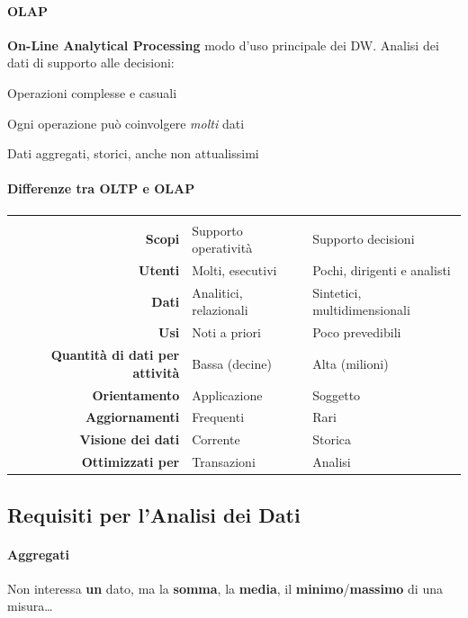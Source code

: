 \documentclass[10pt]{book}
\begin{document}
\begin{multicols}{2}
\paragraph{OLAP} \textbf{On-Line Analytical Processing} modo d'uso principale dei DW. Analisi dei dati di supporto alle decisioni:
\begin{list}{}{}
	\item Operazioni complesse e casuali
	\item Ogni operazione può coinvolgere \textit{molti} dati
	\item Dati aggregati, storici, anche non attualissimi
\end{list}
\end{multicols}
\pagebreak
\paragraph{Differenze tra OLTP e OLAP}
\begin{center}
	\begin{tabular}{r | l | l}
	 & \makecell{\textbf{OLTP}} & \makecell{\textbf{OLAP}} \\
	\textbf{Scopi} & Supporto operatività & Supporto decisioni \\
	\textbf{Utenti} & Molti, esecutivi & Pochi, dirigenti e analisti \\
	\textbf{Dati} & Analitici, relazionali & Sintetici, multidimensionali \\
	\textbf{Usi} & Noti a priori & Poco prevedibili \\
	\textbf{Quantità di dati per attività} & Bassa (decine) & Alta (milioni) \\
	\textbf{Orientamento} & Applicazione & Soggetto \\
	\textbf{Aggiornamenti} & Frequenti & Rari \\
	\textbf{Visione dei dati} & Corrente & Storica \\
	\textbf{Ottimizzati per} & Transazioni & Analisi
	\end{tabular}
\end{center}
\subsection{Requisiti per l'Analisi dei Dati}
\paragraph{Aggregati} Non interessa \textbf{un} dato, ma la \textbf{somma}, la \textbf{media}, il \textbf{minimo}/\textbf{massimo} di una misura\ldots
\end{document}
